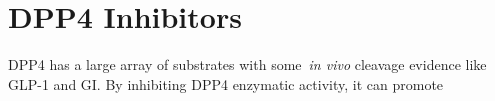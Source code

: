 \section{DPP4 Inhibitors}
DPP4 has a large array of substrates with some~\textit{in vivo} cleavage evidence like GLP-1 and GI. By inhibiting DPP4 enzymatic activity, it can promote 